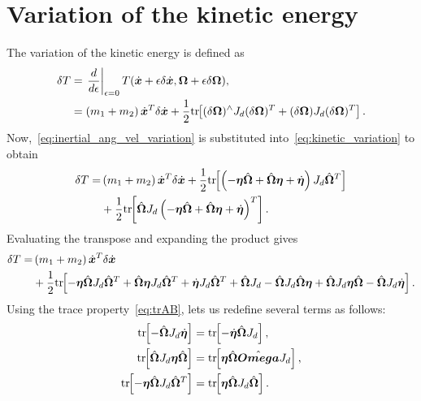 \section{Variation of the kinetic energy}\label{sec:inertial_kinetic_energy_variation}
The variation of the kinetic energy is defined as
\begin{align}
    \delta T &= \left. \frac{d }{d \epsilon}\right|_{\epsilon=0} T(\dot{\bm{x}} + \epsilon \delta \dot{\bm{x}}, \bm{\Omega} + \epsilon \delta \bm{\Omega}), \nonumber\\
             &=   \left( m_1 + m_2 \right) \dot{\bm{x}}^T \delta \dot{\bm{x}} + \frac{1}{2} \mathrm{tr}\negthickspace\left[  (\delta \bm{\Omega} )^\wedge J_d (\delta \bm{\Omega} )^T + (\delta \bm{\Omega})J_d (\delta \bm{\Omega})^T \right]\label{eq:kinetic_variation}.
\end{align}
Now,~\cref{eq:inertial_ang_vel_variation} is substituted into~\cref{eq:kinetic_variation} to obtain
\begin{align*}
    \delta T =&  \left( m_1 + m_2 \right) \dot{\bm{x}}^T \delta \dot{\bm{x}} + \frac{1}{2} \mathrm{tr}\negthickspace\left[ \left( -\bm{\eta} \hat{\bm{\Omega}} + \hat{\bm{\Omega}} \bm{\eta} + \dot{\bm{\eta}} \right) J_d \hat{\bm{\Omega}}^T \right] \nonumber \\
              &+ \frac{1}{2} \mathrm{tr}\negthickspace\left[ \hat{\bm{\Omega}} J_d \left( -\bm{\eta} \hat{\bm{\Omega}} + \hat{\bm{\Omega}} \bm{\eta} + \dot{\bm{\eta}} \right)^T \right] .
\end{align*}
Evaluating the transpose and expanding the product gives
\begin{align*}
    \delta T =&  \left( m_1 + m_2 \right) \dot{\bm{x}}^T \delta \dot{\bm{x}} \\
              &+ \frac{1}{2} \mathrm{tr}\negthickspace\left[  -\bm{\eta} \hat{\bm{\Omega}} J_d \hat{\bm{\Omega}}^T + \hat{\bm{\Omega}} \bm{\eta} J_d \hat{\bm{\Omega}}^T + \dot{\bm{\eta}} J_d \hat{\bm{\Omega}}^T + \hat{\bm{\Omega}} J_d -\hat{\bm{\Omega}} J_d \hat{\bm{\Omega}} \bm{\eta} + \hat{\bm{\Omega}} J_d \bm{\eta} \hat{\bm{\Omega}} - \hat{\bm{\Omega}} J_d \dot{\bm{\eta}} \right].
\end{align*}
Using the trace property~\cref{eq:trAB}, lets us redefine several terms as follows:
\begin{subequations}\label{eq:inertial_kinetic_energy_substitutions}
\begin{align}
    \mathrm{tr}\negthickspace\left[ -\hat{\bm{\Omega}} J_d \dot{\bm{\eta}} \right] &= \mathrm{tr}\negthickspace\left[ - \dot{\bm{\eta}} \hat{\bm{\Omega}} J_d \right] , \\
    \mathrm{tr}\negthickspace\left[ \hat{\bm{\Omega}} J_d \bm{\eta} \hat{\bm{\Omega}} \right] &= \mathrm{tr}\negthickspace\left[ \bm{\eta} \hat{\bm{\Omega}} \hat{\bm{Omega}} J_d \right] , \\
    \mathrm{tr}\negthickspace\left[ -\bm{\eta} \hat{\bm{\Omega}} J_d \hat{\bm{\Omega}}^T \right] &= \mathrm{tr}\negthickspace\left[ \bm{\eta} \hat{\bm{\Omega}} J_d \hat{\bm{\Omega}} \right] .
\end{align}
\end{subequations}     
